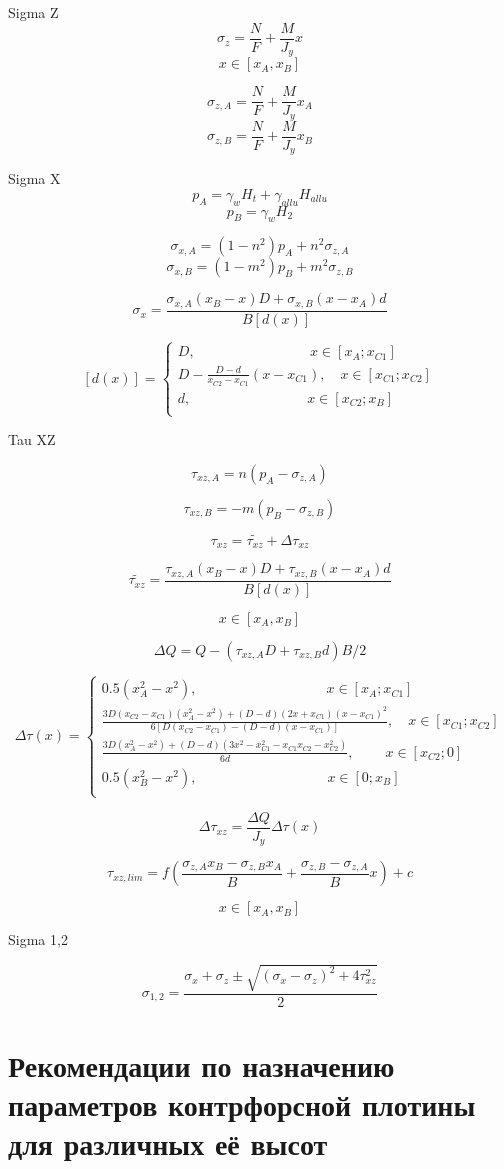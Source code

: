 \documentclass[12pt,a4paper,oneside,draft,titlepage]{article}
\begin{document}
 Sigma Z
 $$ \sigma_z = \frac{N}{F} + \frac{M}{J_y}x $$
 $$ x \in [x_A, x_B] $$

 $$ \sigma_{z,A} = \frac{N}{F} + \frac{M}{J_y}x_A $$
 $$ \sigma_{z,B} = \frac{N}{F} + \frac{M}{J_y}x_B $$

 Sigma X
 $$ p_A = \gamma_w  H_t + \gamma_{allu}  H_{allu} $$
 $$ p_B = \gamma_w  H_2 $$

 $$ \sigma_{x,A} = (1 - n ^ 2)  p_A + n ^ 2  \sigma_{z,A} $$
 $$ \sigma_{x,B} = (1 - m ^ 2)  p_B + m ^ 2  \sigma_{z,B} $$

 $$ \sigma_x = \frac{\sigma_{x,A} (x_B - x) D + \sigma_{x,B} (x - x_A) d}{B [d(x)]} $$

 $$ [d(x)] =
 \begin{cases}
 D, \qquad \qquad \qquad \qquad \,x \in [x_A; x_{C1}]\\
 D - \frac{D - d}{x_{C2} - x_{C1}} (x - x_{C1}), \quad x \in [x_{C1}; x_{C2}]\\
 d, \qquad \qquad \qquad \qquad \; x \in [x_{C2}; x_B]\\
 \end{cases}
 $$

 Tau XZ
 
 $$ \tau_{xz,A} = n (p_A - \sigma_{z,A}) $$
 
 $$ \tau_{xz,B} = -m (p_B - \sigma_{z,B}) $$

 $$ \tau_{xz} = \tilde{\tau_{xz}} + \Delta \tau_{xz} $$

 $$ \tilde{\tau_{xz}} = \frac{\tau_{xz,A} (x_B - x) D + \tau_{xz,B} (x - x_A) d }{B [d(x)]} $$
 
 $$ x \in [x_A, x_B] $$

 $$ \Delta Q = Q - (\tau_{xz,A} D + \tau_{xz,B} d) B / 2 $$

 $$ \Delta \tau (x) =
 \begin{cases}
 0.5  (x_A ^ 2 - x ^ 2), \qquad \qquad \qquad \qquad \quad \: x \in [x_A; x_{C1}]\\
 \frac{3D(x_{C2}-x_{C1})(x_A ^ 2 - x ^ 2)+(D-d)(2x+x_{C1})(x-x_{C1})^2}{6[D(x_{C2}-x_{C1})-(D-d)(x-x_{C1})]}, \quad  x \in [x_{C1}; x_{C2}]\\
 \frac{3D(x_A^2-x^2)+(D-d)(3x^2-x_{C1}^2-x_{C1}x_{C2}-x_{C2}^2)}{6 d}, \quad \quad \: x \in [x_{C2}; 0]\\
 0.5  (x_B ^ 2 - x ^ 2), \qquad \qquad \qquad \qquad \quad \; x \in [0; x_B]\\
 \end{cases}
 $$

 $$ \Delta \tau_{xz} = \frac{\Delta Q}{J_y} \Delta \tau (x) $$

 $$ \tau_{xz,lim} = f  (\frac{\sigma_{z,A}  x_B - \sigma_{z,B}  x_A}{  B} + \frac{\sigma_{z,B} - \sigma_{z,A} } {B} x) + c $$
 
 $$ x \in [x_A, x_B] $$

 Sigma 1,2
 
$$ \sigma_{1,2} = \frac{\sigma_x + \sigma_z \pm \sqrt{(\sigma_x - \sigma_z) ^ 2 + 4  \tau_{xz} ^ 2}} {2} $$

\part{Рекомендации по назначению параметров контрфорсной плотины для различных её высот}
\end{document}
